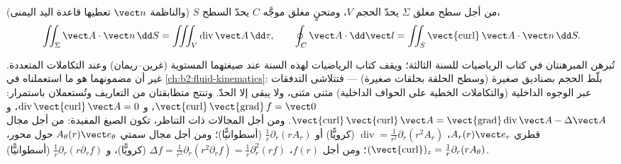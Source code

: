 \begin{theorem}\label{thm:b2:maxwell-equations:theorems}
من أجل سطح مغلق $\Sigma$ يحدّ الحجم $V$، ومنحنٍ مغلق موجَّه
$C$ يحدّ السطح $S$ (والناظمة $\vect n$ تعطيها قاعدة
اليد اليمنى)،
\[
\iint_\Sigma\vect A\cdot\vect n\,\dd S = \iiint_V\operatorname{div}\vect A\,\dd\tau ,
\qquad
\oint_C\vect A\cdot\dd\vect l = \iint_S\operatorname{\vect{curl}}\vect A\cdot\vect n\,\dd S .
\]
\end{theorem}
\admitted

\begin{remark}\label{rem:b2:maxwell-equations:whyadmitted}
تُبرهن المبرهنتان في كتاب الرياضيات للسنة الثالثة؛ ويقف
كتاب الرياضيات لهذه السنة عند صيغتهما المستوية
(غرين--ريمان) وعند التكاملات المتعددة. غير أن مضمونهما
هو ما استعملناه في \cref{ch:b2:fluid-kinematics}: بلّط الحجم
بصناديق صغيرة (وسطح الحلقة بحلقات صغيرة) --- فتتلاشى التدفقات
عبر الوجوه الداخلية (والتكاملات الخطية على الحواف
الداخلية) مثنى مثنى، ولا يبقى إلا الحدّ. وتنتج متطابقتان
من التعاريف وتُستعملان باستمرار:
$\operatorname{\vect{curl}}\operatorname{\vect{grad}}f = \vect 0$، و
$\operatorname{div}\operatorname{\vect{curl}}\vect A = 0$، و
$\operatorname{\vect{curl}}\operatorname{\vect{curl}}\vect A = \operatorname{\vect{grad}}
\operatorname{div}\vect A - \Delta\vect A$. ومن أجل المجالات ذات التناظر، تكون
الصيغ المفيدة: من أجل مجال قطري $A_r(r)\vect e_r$، $\operatorname{div}
= \frac1{r^2}\partial_r(r^2A_r)$ (كرويًّا) أو $\frac1r\partial_r(rA_r)$
(أسطوانيًّا)؛ ومن أجل مجال سمتي $A_\theta(r)\vect e_\theta$ حول
محور، $(\operatorname{\vect{curl}})_z = \frac1r\partial_r(rA_\theta)$؛ ومن أجل $f(r)$،
$\Delta f = \frac1{r^2}\partial_r(r^2\partial_rf) = \frac1r\partial_r^2(rf)$ (كرويًّا)،
و $\frac1r\partial_r(r\partial_rf)$ (أسطوانيًّا).
\end{remark}

